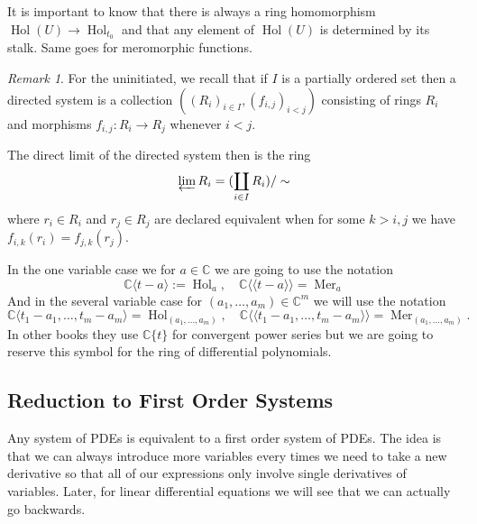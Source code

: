 \documentclass[]{book}
\numberwithin{equation}{section}
\theoremstyle{definition}
\theoremstyle{remark}
\newtheorem{remark}[theorem]{Remark}
\newcommand{\CC}{\mathbb{C}}
\newcommand{\hol}{\operatorname{Hol}}
\newcommand{\Mer}{\operatorname{Mer}}
\newcommand{\llangle}{\langle \langle}
\newcommand{\rrangle}{\rangle \rangle}
\begin{document}
It is important to know that there is always a ring homomorphism $\hol(U) \to \hol_{t_0}$ and that any element of $\hol(U)$ is determined by its stalk. 
Same goes for meromorphic functions.

\begin{remark}
	For the uninitiated, we recall that if $I$ is a partially ordered set then a directed system is a collection $((R_i)_{i\in I},(f_{i,j})_{i<j})$ consisting of rings $R_i$ and morphisms $f_{i,j}:R_i \to R_j$ whenever $i<j$. 
	
	The direct limit of the directed system then is the ring 
	 $$ \varprojlim R_i = (\coprod_{i\in I} R_i)/\sim $$
	where $r_i \in R_i$ and $r_j \in R_j$ are declared equivalent when for some $k>i,j$ we have $f_{i,k}(r_i)  = f_{j,k}(r_j)$.
\end{remark}

In the one variable case we for $a\in \CC$ we are going to use the notation 
 $$ \CC\langle t-a \rangle := \hol_a, \quad \CC\llangle t-a \rrangle = \Mer_a $$
And in the several variable case for $(a_1,\ldots,a_m) \in \CC^m$ we will use the notation
 $$ \CC\langle t_1 -a_1,\ldots, t_m - a_m\rangle = \hol_{(a_1,\ldots,a_m)}, \quad \CC\llangle t_1-a_1,\ldots, t_m-a_m \rrangle = \Mer_{(a_1,\ldots,a_m)}.$$
 In other books they use $\CC\lbrace t \rbrace$ for convergent power series but we are going to reserve this symbol for the ring of differential polynomials.

\subsection{Reduction to First Order Systems}

Any system of PDEs is equivalent to a first order system of PDEs.
The idea is that we can always introduce more variables every times we need to take a new derivative so that all of our expressions only involve single derivatives of variables. 
Later, for linear differential equations we will see that we can actually go backwards. 
\end{document}
